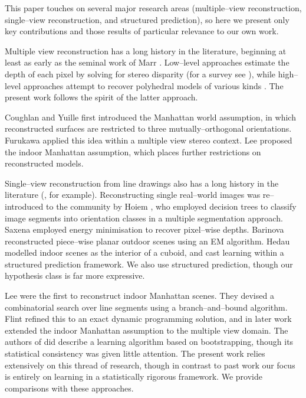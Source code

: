 This paper touches on several major research areas (multiple--view
reconstruction, single--view reconstruction, and structured
prediction), so here we present only key contributions and those
results of particular relevance to our own work.

Multiple view reconstruction has a long history in the literature,
beginning at least as early as the seminal work of Marr \etal
\cite{Marr1976}. Low--level approaches estimate the depth of each
pixel by solving for stereo disparity (for a survey see
\cite{Scharstein2002}), while high--level approaches attempt to
recover polyhedral models of various kinds
\cite{Baillard1999,Liebowitz1999}. The present work follows the spirit
of the latter approach.

Coughlan and Yuille \cite{Coughlan99} first introduced the Manhattan
world assumption, in which reconstructed surfaces are restricted to three
mutually--orthogonal orientations. Furukawa \etal \cite{Furukawa09}
applied this idea within a multiple view stereo context. Lee \etal
\cite{Lee09} proposed the indoor Manhattan assumption, which places
further restrictions on reconstructed models.

Single--view reconstruction from line drawings also has a long history
in the literature (\cite{Huffman71}, for example). Reconstructing
single real--world images was re--introduced to the community by Hoiem
\etal \cite{Hoiem05}, who employed decision trees to classify image
segments into orientation classes in a multiple segmentation
approach. Saxena \etal \cite{Saxena09} employed energy minimisation to
recover pixel--wise depths. Barinova \etal \cite{Barinova08}
reconstructed piece--wise planar outdoor scenes using an EM
algorithm. Hedau \etal \cite{Hedau09} modelled indoor scenes as the
interior of a cuboid, and cast learning within a structured prediction
framework. We also use structured prediction, though our hypothesis
class is far more expressive.

Lee \etal \cite{Lee09} were the first to reconstruct indoor Manhattan
scenes. They devised a combinatorial search over line segments using a
branch--and--bound algorithm. Flint \etal
\cite{Flint10eccv} refined this to an exact dynamic
programming solution, and in later work \cite{Flint11} extended the
indoor Manhattan assumption to the multiple view domain. The authors
of \cite{Flint11} did describe a learning algorithm based on
bootstrapping, though its statistical consistency was given little
attention. The present work relies extensively on this thread of
research, though in contrast to past work our focus is entirely on
learning in a statistically rigorous framework. We provide comparisons
with these approaches.

